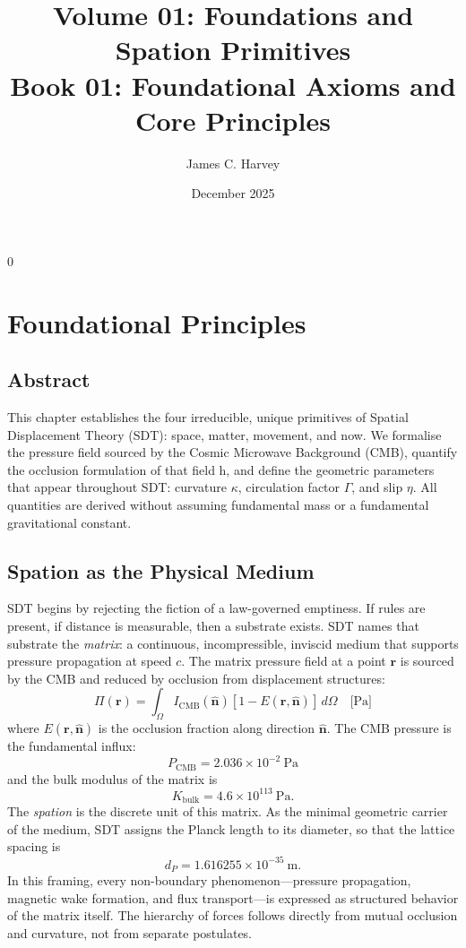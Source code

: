 0\documentclass[12pt]{book}
\title{Volume 01: Foundations and Spation Primitives \\ Book 01: Foundational Axioms and Core Principles}
\author{James C. Harvey}
\date{December 2025}
\begin{document}
\maketitle

\tableofcontents

\chapter{Foundational Principles}

\section*{Abstract}
This chapter establishes the four irreducible, unique primitives of Spatial Displacement Theory (SDT): space, matter, movement, and now. We formalise the pressure field sourced by the Cosmic Microwave Background (CMB), quantify the occlusion formulation of that field h, and define the geometric parameters that appear throughout SDT: curvature $\kappa$, circulation factor $\Gamma$, and slip $\eta$. All quantities are derived without assuming fundamental mass or a fundamental gravitational constant.


\section{Spation as the Physical Medium}
SDT begins by rejecting the fiction of a law-governed emptiness. If rules are present, if distance is
measurable, then a substrate exists. SDT names that substrate the \textit{matrix}: a continuous,
incompressible, inviscid medium that supports pressure propagation at speed $c$. The matrix pressure
field at a point $\mathbf{r}$ is sourced by the CMB and reduced by occlusion from displacement structures:
\begin{equation}
\Pi(\mathbf{r}) = \int_{\Omega} I_{\text{CMB}}(\hat{\mathbf{n}})\left[1 - E(\mathbf{r}, \hat{\mathbf{n}})\right]\, d\Omega
\quad \text{[Pa]}
\end{equation}
where $E(\mathbf{r}, \hat{\mathbf{n}})$ is the occlusion fraction along direction $\hat{\mathbf{n}}$.
The CMB pressure is the fundamental influx:
\begin{equation}
P_{\text{CMB}} = 2.036 \times 10^{-2} \ \text{Pa}
\end{equation}
and the bulk modulus of the matrix is
\begin{equation}
K_{\text{bulk}} = 4.6 \times 10^{113} \ \text{Pa}.
\end{equation}
The \textit{spation} is the discrete unit of this matrix. As the minimal geometric carrier of the
medium, SDT assigns the Planck length to its diameter, so that the lattice spacing is
\begin{equation}
d_P = 1.616255 \times 10^{-35}\ \text{m}.
\end{equation}
In this framing, every non-boundary phenomenon—pressure propagation, magnetic wake formation, and flux
transport—is expressed as structured behavior of the matrix itself. The hierarchy of forces follows
directly from mutual occlusion and curvature, not from separate postulates.
\end{document}
